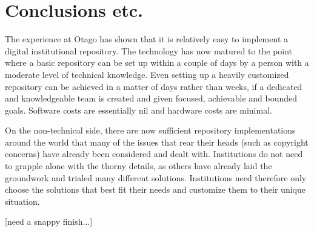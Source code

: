 \documentclass[12pt,pdftex,a4paper,titlepage]{article}
\begin{document}
\section{Conclusions etc.}

The experience at Otago has shown that it is relatively easy to implement a digital institutional repository. The technology has now matured to the point where a basic repository can be set up within a couple of days by a person with a moderate level of technical knowledge. Even setting up a heavily customized repository can be achieved in a matter of days rather than weeks, if a dedicated and knowledgeable team is created and given focused, achievable and bounded goals. Software costs are essentially nil and hardware costs are minimal.

On the non-technical side, there are now sufficient repository implementations around the world that many of the issues that rear their heads (such as copyright concerns) have already been considered and dealt with. Institutions do not need to grapple alone with the thorny details, as others have already laid the groundwork and trialed many different solutions. Institutions need therefore only choose the solutions that best fit their needs and customize them to their unique situation.

[need a snappy finish...]



\end{document}

